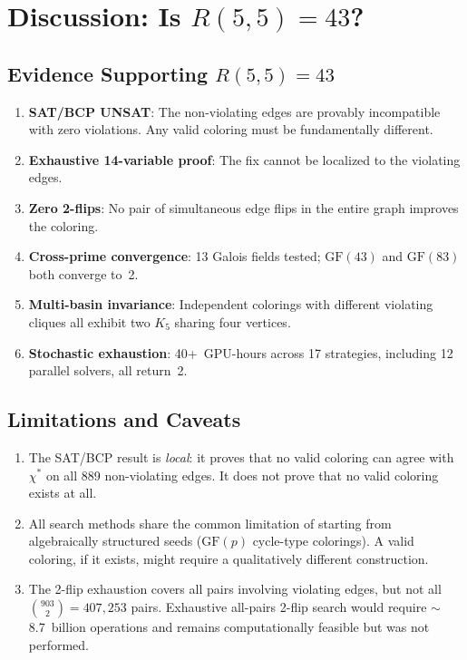 \documentclass[11pt,a4paper]{article}
\theoremstyle{plain}
\theoremstyle{remark}
\newcommand{\GF}{\mathrm{GF}}
\begin{document}
\section{Discussion: Is $R(5,5) = 43$?}
\label{sec:discussion}

\subsection{Evidence Supporting $R(5,5) = 43$}

\begin{enumerate}[leftmargin=2em]
  \item \textbf{SAT/BCP UNSAT}: The non-violating edges are provably
    incompatible with zero violations. Any valid coloring must be
    fundamentally different.
  \item \textbf{Exhaustive 14-variable proof}: The fix cannot be
    localized to the violating edges.
  \item \textbf{Zero 2-flips}: No pair of simultaneous edge flips
    in the entire graph improves the coloring.
  \item \textbf{Cross-prime convergence}: 13 Galois fields tested;
    $\GF(43)$ and $\GF(83)$ both converge to~2.
  \item \textbf{Multi-basin invariance}: Independent colorings with
    different violating cliques all exhibit two $K_5$ sharing four
    vertices.
  \item \textbf{Stochastic exhaustion}: 40+~GPU-hours across 17
    strategies, including 12 parallel solvers, all return~2.
\end{enumerate}

\subsection{Limitations and Caveats}

\begin{enumerate}[leftmargin=2em]
  \item The SAT/BCP result is \emph{local}: it proves that no valid
    coloring can agree with $\chi^*$ on all 889 non-violating edges.
    It does not prove that no valid coloring exists at all.
  \item All search methods share the common limitation of starting
    from algebraically structured seeds ($\GF(p)$ cycle-type
    colorings). A valid coloring, if it exists, might require a
    qualitatively different construction.
  \item The 2-flip exhaustion covers all pairs involving violating
    edges, but not all $\binom{903}{2} = 407{,}253$ pairs. Exhaustive
    all-pairs 2-flip search would require $\sim$8.7~billion operations
    and remains computationally feasible but was not performed.
\end{enumerate}
\end{document}
